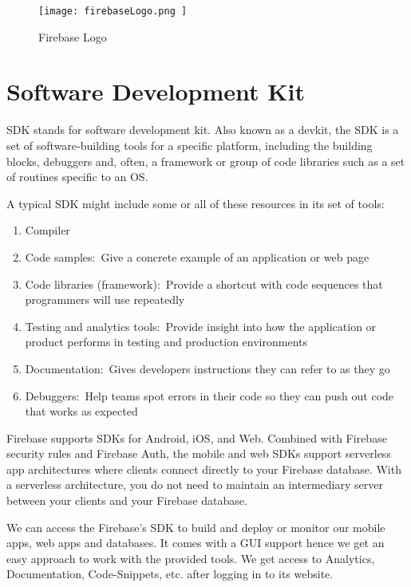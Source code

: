 \documentclass[12pt,a4paper]{report}
\begin{document}

\begin{figure}[ht]
    \centering
    \texttt{[image: firebaseLogo.png  ]}%
    \caption{\fontsize{12}{0}\selectfont Firebase Logo }%
    \label{fig:logo} %
\end{figure}

\newpage
\section{{\fontsize{16}{0}\selectfont Software Development Kit }}
{\fontsize{14}{0}\selectfont
\noindent
\ac{SDK} stands for software development kit. Also known as a devkit, the \ac{SDK} is a set of software-building tools for a specific platform, including the building blocks, debuggers and, often, a framework or group of code libraries such as a set of routines specific to an \ac{OS}.\break


\noindent
A typical SDK might include some or all of these resources in its set of tools:

\begin{enumerate}
  \item Compiler
  \item Code samples: Give a concrete example of an application or web page
  \item Code libraries (framework): Provide a shortcut with code sequences that programmers will use repeatedly
  \item Testing and analytics tools: Provide insight into how the application or product performs in testing and production environments
  \item Documentation: Gives developers instructions they can refer to as they go
  \item Debuggers: Help teams spot errors in their code so they can push out code that works as expected
\end{enumerate}


\hspace{1cm}Firebase supports \ac{SDK}s for Android, \ac{iOS}, and Web. Combined with Firebase security rules and Firebase Auth, the mobile and web SDKs support serverless app architectures where clients connect directly to your Firebase database. With a serverless architecture, you do not need to maintain an intermediary server between your clients and your Firebase database.

\hspace{1cm}We can access the Firebase's \ac{SDK} to build and deploy or monitor our mobile apps, web apps and databases. It comes with a \ac{GUI} support hence we get an easy approach to work with the provided tools. We get access to Analytics, Documentation, Code-Snippets, etc. after logging in to its website.


}
\newpage
\end{document}
